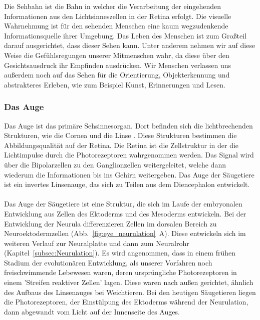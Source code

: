 \documentclass[12pt,a4paper,pdftex]{article}
\begin{document}
Die Sehbahn ist die Bahn in welcher die Verarbeitung der eingehenden Informationen aus den Lichtsinneszellen in der Retina erfolgt. Die visuelle Wahrnehmung ist für den sehenden Menschen eine kaum wegzudenkende Informationsquelle ihrer Umgebung. Das Leben des Menschen ist zum Großteil darauf ausgerichtet, dass dieser Sehen kann. Unter anderem nehmen wir auf diese Weise die Gefühlsregungen unserer Mitmenschen wahr, da diese über den Gesichtsausdruck ihr Empfinden ausdrücken. Wir Menschen verlassen uns außerdem noch auf das Sehen für die Orientierung, Objekterkennung und abstrakteres Erleben, wie zum Beispiel Kunst, Erinnerungen und Lesen.


\subsubsection*{Das Auge}
Das Auge ist das primäre Sehsinnesorgan. Dort befinden sich die lichtbrechenden Strukturen, wie die Cornea  und die Linse . Diese Strukturen  bestimmen die Abbildungsqualität auf der Retina. Die Retina ist die Zellstruktur in der die Lichtimpulse durch die Photorezeptoren wahrgenommen werden. Das Signal wird über die Bipolarzellen zu den Ganglionzellen weitergeleitet, welche dann wiederum die Informationen bis ins Gehirn weitergeben.
Das Auge der Säugetiere ist ein invertes Linsenauge,  das sich zu Teilen aus dem Diencephalon entwickelt. 
\\
\\
Das Auge der Säugetiere ist eine Struktur, die sich im Laufe der embryonalen Entwicklung aus Zellen des Ektoderms und des Mesoderms entwickeln. Bei der Entwicklung der Neurula differenzieren Zellen im dorsalen Bereich zu Neuroektodermzellen  (Abb.~\ref{fig:eye_neurulation}~A). Diese entwickeln sich im weiteren Verlauf zur Neuralplatte und dann zum Neuralrohr (Kapitel~\ref{subsec:Neurulation}). 
Es wird angenommen, dass in einem frühen Stadium der evolutionären Entwicklung, als unserer Vorfahren noch freischwimmende Lebewesen waren, deren ursprüngliche Photorezeptoren in einem 'Streifen reaktiver Zellen' lagen. Diese waren nach außen gerichtet, ähnlich des Aufbaus des Linsenauges bei Weichtieren. Bei den heutigen Säugetieren liegen die Photorezeptoren, der Einstülpung des Ektoderms während der Neurulation, dann abgewandt vom Licht auf der Innenseite des Auges. 
\end{document}
